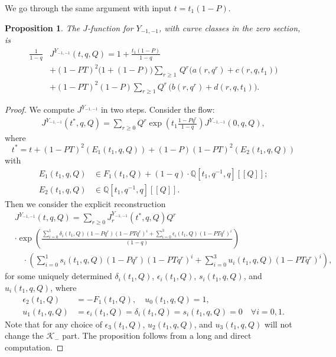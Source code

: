 \documentclass[11pt]{amsart}
\newtheorem{proposition}[theorem]{Proposition}
\newtheorem*{main theorem*}{Main Theorem}
\theoremstyle{remark}
\numberwithin{equation}{section}
\newcommand{\e}{\epsilon}
\begin{document}
We go through the same argument with input $t=t_1(1-P)$.
\begin{proposition} \label{prop_multicover_t}
The $J$-function for %
$Y_{-1,-1}$, with curve classes in the zero section, is 
\begin{equation} \label{e:4.3}
\begin{split}
\frac{1}{1-q} & J^{Y_{-1,-1}}(t, q, Q) = 1 + \frac{t_1(1-P)}{1-q}
\\
&+  (1-PT)^2\Big(1 +(1-P)\Big)\sum_{r \geq 1} \, Q^r\Big( a(r, q^r) + c(r,q, t_1) \Big) %
\\
& + (1-PT)^2(1-P) \sum_{r\geq 1} Q^r \, \Big( b(r, q^r) + d(r,q, t_1) \Big) . %
\end{split} 
\end{equation}
\end{proposition}
\begin{proof}
We compute $J^{Y_{-1,-1}}$ in two steps. Consider the flow:
\[
\begin{split}
    J^{Y_{-1,-1}}(t^*,q,Q) =\sum_{r\geq 0} Q^r \exp \left( t_1 \frac{1-Pq^r}{1-q} \right) J^{Y_{-1,-1}}(0,q,Q),
\end{split}
\]
where 
\[
    t^* = t + (1-PT)^2(E_1(t_1,q,Q)) + (1-P)(1-PT)^2(E_2(t_1,q,Q))
\]
with
\[
\begin{split}
    E_1(t_1,q,Q) & \in F_1(t_1,Q) + (1-q) \cdot  \mathbb{Q}[t_1,q^{-1},q][\![Q]\!];
    \\
    E_2(t_1,q,Q) & \in \mathbb{Q}[t_1,q^{-1},q][\![Q]\!].
\end{split}
\]
Then we consider the explicit reconstruction
\[
\begin{split}
    &J^{Y_{-1,-1}}(t, q, Q) =  \sum_{r\geq 0}  J_r^{Y_{-1,-1}}(t^*,q,Q) Q^r  
    \\ 
    & \cdot\exp \left( \frac{ \sum_{i=0}^1\delta_i(t_1,Q)(1-Pq^{r})(1-PT q^r)^i + \sum_{i=0}^3 \e_i(t_1,Q) (1-PT q^{r})^i}{(1-q)} \right) 
    \\
    &\quad \cdot\left( \sum_{i=0}^1 s_i(t_1,q,Q)(1-Pq^r)(1-PT q^r)^i + \sum_{i=0}^3 u_i(t_1,q,Q) (1-PTq^r)^i \right),
\end{split}
\]
for some uniquely determined $\delta_i(t_1,Q)$, $\epsilon_i(t_1,Q)$, $s_i(t_1,q,Q)$, and $u_i(t_1,q,Q)$, where
\[
\begin{split}
    \epsilon_2(t_1,Q) &= - F_1(t_1,Q), \quad u_0(t_1,q,Q) = 1,
    \\
    u_1(t_1,q,Q) &=  \epsilon_i(t_1,Q)=\delta_i(t_1,Q)=s_i(t_1,q,Q)=0\quad \forall i=0,1.
\end{split}
\]
Note that for any choice of $\epsilon_3(t_1,Q)$, $u_2(t_1,q,Q)$, and $u_3(t_1,q,Q)$ will not change the $\mathcal{K}_-$ part. The proposition follows from a long and direct computation.
\end{proof}
\end{document}
